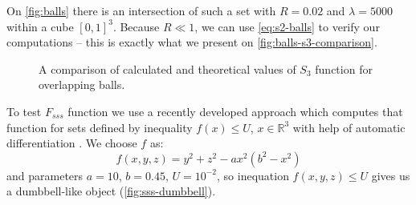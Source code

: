 \documentclass[reprint,amsmath,amssymb,aps,pre,showkeys,showpacs]{revtex4-1}
\begin{document}
On \cref{fig:balls} there is an intersection of such a set with $R = 0.02$ and
$\lambda=5000$ within a cube $[0, 1]^3$. Because $R \ll 1$, we can use
\cref{eq:s2-balls} to verify our computations -- this is exactly what we present on
\cref{fig:balls-s3-comparison}.
\begin{figure}[tp]
  \centering
  \hfill
  \caption[]{A comparison of calculated and theoretical values of $S_3$ function
    for overlapping balls.}
  \label{fig:s3-verification}
\end{figure}

To test $F_{sss}$ function we use a recently developed approach which computes
that function for sets defined by inequality $f(x) \le U$, $x \in \mathbb{R}^3$
with help of automatic differentiation \cite{postnicov20232}. We choose $f$ as:
\begin{equation}
  f(x, y, z) = y^2 + z^2 - a x^2 (b^2 - x^2)
\end{equation}
and parameters $a = 10$, $b = 0.45$, $U = 10^{-2}$, so inequation
$f(x, y, z) \le U$ gives us a dumbbell-like object (\cref{fig:sss-dumbbell}).
\end{document}
